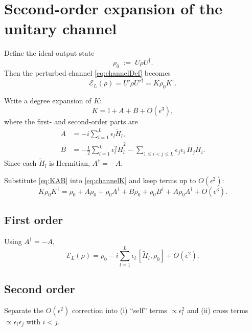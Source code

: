 \documentclass[11pt]{article}
\newcommand{\id}{\mathbb{I}}
\newcommand{\cE}{\mathcal{E}}
\begin{document}
\section{Second-order expansion of the unitary channel}

Define the ideal-output state
\begin{equation}
\rho_0 \;:=\; U\rho U^\dagger.
\label{eq:rho0}
\end{equation}
Then the perturbed channel \eqref{eq:channelDef} becomes
\begin{equation}
\cE_L(\rho) = U'\rho U'^\dagger = K\rho_0 K^\dagger.
\label{eq:channelK}
\end{equation}

Write a degree expansion of $K$:
\begin{equation}
K = \id + A + B + O(\epsilon^3),
\label{eq:KAB}
\end{equation}
where the first- and second-order parts are
\begin{align}
A &= -i\sum_{l=1}^{L}\epsilon_l \widetilde H_l,
\label{eq:Adef}\\
B &= -\frac12\sum_{l=1}^{L}\epsilon_l^2 \widetilde H_l^2
-\sum_{1\le i<j\le L}\epsilon_j\epsilon_i\,\widetilde H_j\widetilde H_i.
\label{eq:Bdef}
\end{align}
Since each $\widetilde H_l$ is Hermitian, $A^\dagger=-A$.

Substitute \eqref{eq:KAB} into \eqref{eq:channelK} and keep terms up to $O(\epsilon^2)$:
\begin{equation}
K\rho_0 K^\dagger
=
\rho_0
+ A\rho_0 + \rho_0A^\dagger
+ B\rho_0 + \rho_0B^\dagger
+ A\rho_0 A^\dagger
+ O(\epsilon^3).
\label{eq:channelExpand}
\end{equation}

\subsection{First order}

Using $A^\dagger=-A$,
\begin{equation}
\boxed{
\cE_L(\rho) = \rho_0 - i\sum_{l=1}^{L}\epsilon_l\,[\widetilde H_l,\rho_0] + O(\epsilon^2).
}
\label{eq:channel1st}
\end{equation}

\subsection{Second order}

Separate the $O(\epsilon^2)$ correction into (i) ``self'' terms $\propto \epsilon_l^2$ and (ii) cross terms $\propto \epsilon_i\epsilon_j$ with $i<j$.
\end{document}
